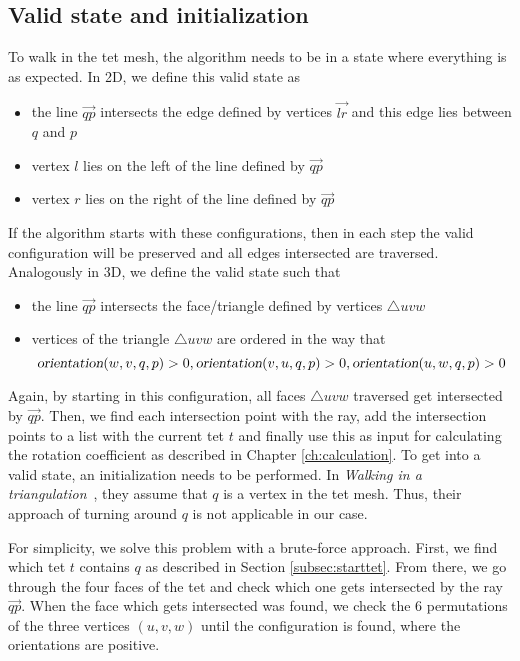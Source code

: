 \documentclass[../thesis.tex]{subfiles}
\begin{document}
\subsection{Valid state and initialization}\label{subsec:validstate}
To walk in the tet mesh, the algorithm needs to be in a state where everything is as expected.
In 2D, we define this valid state as
\begin{itemize}
  \item the line $\Vec{qp}$ intersects the edge defined by vertices $\Vec{lr}$ and this edge lies between $q$ and $p$
  \item vertex $l$ lies on the left of the line defined by $\Vec{qp}$
  \item vertex $r$ lies on the right of the line defined by $\Vec{qp}$
\end{itemize}
If the algorithm starts with these configurations, then in each step
the valid configuration will be preserved and all edges intersected are
traversed. 
Analogously in 3D, we define the valid state such that
\begin{itemize}
  \item the line $\Vec{qp}$ intersects the face/triangle defined by vertices $\triangle uvw$
  \item vertices of the triangle $\triangle uvw$ are ordered in the way that
  $$\textsl{orientation}(w,v,q,p)>0, \textsl{orientation}(v,u,q,p)>0, \textsl{orientation}(u,w,q,p)>0$$
\end{itemize}
Again, by starting in this configuration, all faces $\triangle uvw$
traversed get intersected by $\Vec{qp}$. Then, we find each
intersection point with the ray, add the intersection points to a list
with the current tet $t$ and finally use this as input for
calculating the rotation coefficient as described in Chapter \ref{ch:calculation}.
To get into a valid state, an initialization needs to be performed.
In \emph{Walking in a triangulation}~\cite{Devillers}, they assume that
$q$ is a vertex in the tet mesh. Thus, their approach of turning around $q$
is not applicable in our case.

For simplicity, we solve this problem with a brute-force approach.
First, we find which tet $t$ contains $q$ as described in Section \ref{subsec:starttet}.
From there, we go through the four faces of the tet and check which
one gets intersected by the ray $\Vec{qp}$.
When the face which gets intersected was found,
we check the 6 permutations of the three vertices $(u,v,w)$
until the configuration is found, where the orientations are positive.
\end{document}
